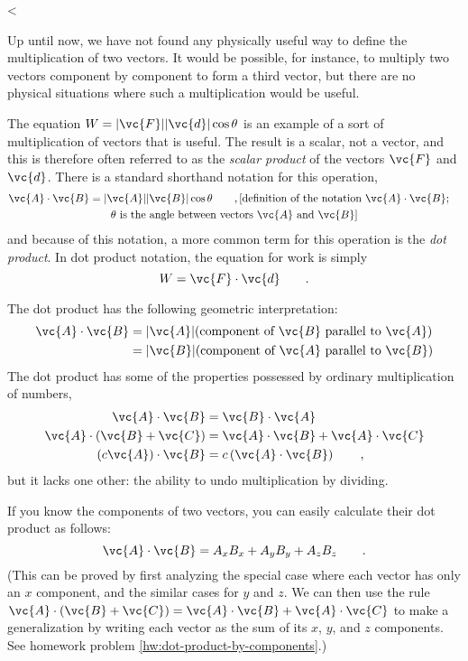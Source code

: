 <%

Up until now, we have not found any physically useful way to
define the multiplication of two vectors. It would be
possible, for instance, to multiply two vectors component by
component to form a third vector, but there are no physical
situations where such a multiplication would be useful.

The equation $W= |\vc{F}| |\vc{d}| \cos \theta$ is an example of
a sort of multiplication of vectors that is useful. The
result is a scalar, not a vector, and this is therefore
often referred to as the \emph{scalar product} of the
vectors $\vc{F}$ and $\vc{d}$. There is a standard shorthand
notation for this operation,
\begin{multline*}
 \vc{A}\cdot\vc{B} = |\vc{A}| |\vc{B}| \cos \theta \qquad ,
    \hfill \shoveright{\text{[definition of the notation $\vc{A}\cdot\vc{B}$;}}\\
    \text{$\theta$ is the angle between vectors $\vc{A}$ and $\vc{B}$]}
\end{multline*}
and because of this notation, a more common term for this
operation is the \emph{dot product}. In dot product
notation, the equation for work is simply
\begin{equation*}
  W = \vc{F}\cdot\vc{d} \qquad .
\end{equation*}

 The dot product has the following geometric interpretation:
\begin{align*}
\vc{A}\cdot\vc{B} &= |\vc{A}|  (\text{component of $\vc{B}$ parallel to $\vc{A}$}) \\
 &= |\vc{B}|  (\text{component of $\vc{A}$ parallel to $\vc{B}$})
\end{align*}
The dot product has some of the properties possessed by
ordinary multiplication of numbers,
\begin{align*}
\vc{A}\cdot\vc{B} &= \vc{B}\cdot\vc{A} \\
\vc{A}\cdot(\vc{B}+\vc{C}) &= \vc{A}\cdot\vc{B}+\vc{A}\cdot\vc{C} \\
\left(c\vc{A}\right)\cdot\vc{B} &= c\left(\vc{A}\cdot\vc{B}\right) \qquad ,
\end{align*}
but it lacks one other: the ability to undo multiplication by dividing.

If you know the components of two vectors, you can easily
calculate their dot product as follows:
\begin{equation*}
  \vc{A}\cdot\vc{B} = A_xB_x+A_yB_y+A_zB_z \qquad .
\end{equation*}
(This can be proved by first analyzing the special case where
each vector has only an $x$ component, and the similar cases
for $y$ and $z$. We can then use the rule 
$\vc{A}\cdot(\vc{B}+\vc{C}) = \vc{A}\cdot\vc{B}+\vc{A}\cdot\vc{C}$
to make a generalization
by writing each vector as the sum of its $x$, $y$, and $z$ components.
See homework problem \ref{hw:dot-product-by-components}.)
\label{dot-product-by-components}

